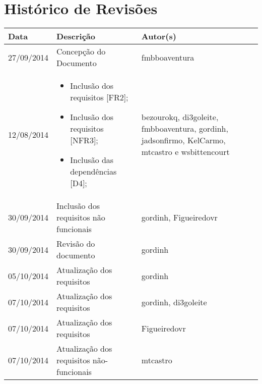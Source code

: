 \documentclass{article}
\begin{document}

\capa
\newpage

\section*{\center Histórico de Revisões}
  \vspace*{1cm}
  \begin{table}[ht]
    \centering
    \begin{tabular}[pos]{|m{2cm} | m{7.2cm} | m{3.8cm}|} 
      \hline
      \cellcolor[gray]{0.9}
      \textbf{Data} & \cellcolor[gray]{0.9}\textbf{Descrição} & \cellcolor[gray]{0.9}\textbf{Autor(s)}\\ \hline
      \hline
      \small 27/09/2014 & \small Concepção do Documento & \small fmbboaventura \\ \hline     
      \small 12/08/2014 &
      \begin{small}
        \begin{itemize}
          \item Inclusão dos requisitos [FR2];
          \item Inclusão dos requisitos [NFR3];
          \item Inclusão das dependências [D4];
        \end{itemize}
      \end{small} & \small bezourokq, di3goleite, fmbboaventura, gordinh, jadsonfirmo, KelCarmo, mtcastro e wsbittencourt \\ \hline
      \small 30/09/2014 & \small Inclusão dos requisitos não funcionais & \small gordinh, Figueiredovr \\ \hline
      \small 30/09/2014 & \small Revisão do documento & \small gordinh \\ \hline
      \small 05/10/2014 & \small Atualização dos requisitos & \small gordinh \\ \hline
      \small 07/10/2014 & \small Atualização dos requisitos & \small gordinh, di3goleite \\ \hline
      \small 07/10/2014 & \small Atualização dos requisitos & \small Figueiredovr \\ \hline
      \small 07/10/2014 & \small Atualização dos requisitos não-funcionais & \small mtcastro \\ \hline

\end{tabular}
\end{table}
\end{document}
